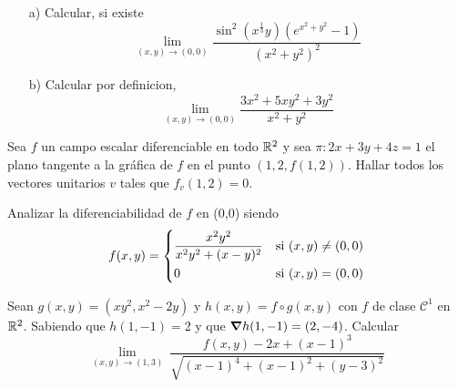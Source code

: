 
\begin{question}

\vspace{1em} %

\begin{itemize}
    \item[a)] Calcular, si existe
    \[
        \lim_{(x,y)\to(0,0)} \frac{\sin^2{(x^{\frac{1}{3}}y)}(e^{x^2+y^2}-1)}{(x^2+y^2)^2}
    \]
     \item[b)] Calcular por definicion,
     \[
        \lim_{(x,y)\to(0,0)} \frac{3x^2+5xy^2+3y^2}{x^2+y^2}
    \]
\end{itemize}



\end{question}

\begin{question}
    Sea $f$ un campo escalar diferenciable en todo $\mathbb{R}^2$ y sea $\pi:2x+3y+4z=1$ el plano tangente a la gráfica de $f$ en el punto $(1,2,f(1,2))$. Hallar todos los vectores unitarios $v$ tales que $f_v(1,2)=0.$
\end{question}
\begin{question}
    Analizar la diferenciabilidad de $f$ en (0,0) siendo
      \[
        f(x,y) =
        \begin{dcases}
            \frac{x^2y^2}{x^2y^2+(x-y)^2} & \textnormal{si}\ (x,y) \neq (0,0) \\
            0                         & \textnormal{si}\ (x,y) = (0,0)
        \end{dcases}
    \]
\end{question}
\begin{question}
    Sean $g(x,y)=(xy^2,x^2-2y)$ y $h(x,y)=f \circ g(x,y)$ con $f$ de clase $\mathcal{C}^1$ en $\mathbb{R}^2$. Sabiendo que $h(1,-1)=2$ y que $\grad h(1,-1)=(2,-4)$. Calcular
    \[
        \lim_{(x,y)\to (1,3)} \ 
        \frac{f(x,y)-2x+(x-1)^3}{\sqrt{(x-1)^4+(x-1)^2+(y-3)^2}}       
    \]
\end{question}
\newpage

